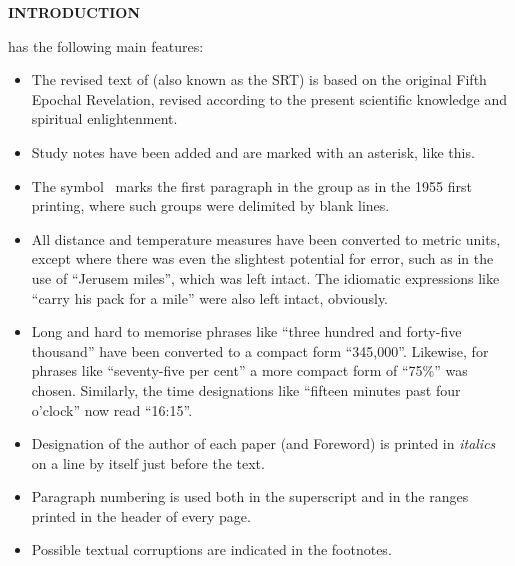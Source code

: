 \newpage
\thispagestyle{empty}

\makeatletter
{}%
\makeatother

\begin{center}
\headingfont\Large{}\bfseries
INTRODUCTION
\end{center}


 has the following main features:

\begin{itemize}
\item The revised text of  (also known as the SRT) is based on the original Fifth Epochal Revelation,
revised according to the present scientific knowledge and spiritual enlightenment.
\item Study notes have been added and are marked with an asterisk, like this\ts{*}.
\item The symbol \pc\ marks the first paragraph in the group as in the 1955 first printing, where such groups were delimited by blank lines.
\item All distance and temperature measures have been converted to metric units, except where there was even the slightest potential for error, such as in the use of ``Jerusem miles'', which was left intact. The idiomatic expressions like ``carry his pack for a mile'' were also left intact, obviously.
\item Long and hard to memorise phrases like ``three hundred and forty\hyp{}five thousand'' have been converted to a compact form ``345,000''. Likewise, for phrases like ``seventy\hyp{}five per cent'' a more compact form of ``75\%'' was chosen. Similarly, the time designations like ``fifteen minutes past four o’clock'' now read ``16:15''.
\item Designation of the author of each paper (and Foreword) is printed in \textit{italics} on a line by itself just before the text.
\item Paragraph numbering is used both in the superscript and in the ranges printed in the head\-er of every page.
\item Possible textual corruptions are indicated in the footnotes.
\end{itemize}

